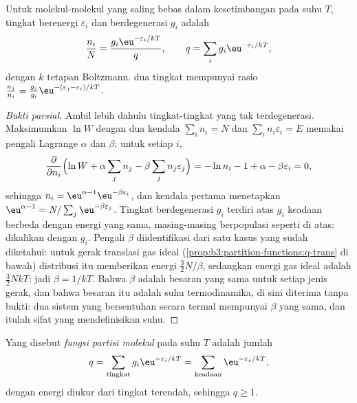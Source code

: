 \begin{theorem}\label{thm:b3:partition-functions:boltzmann}
Untuk molekul-molekul yang saling bebas dalam kesetimbangan pada suhu $T$,
 tingkat berenergi $\varepsilon_i$ dan berdegenerasi $g_i$ adalah
\[
  \frac{n_i}{N} = \frac{g_i\eu^{-\varepsilon_i/kT}}{q},
  \qquad q = \sum_i g_i\eu^{-\varepsilon_i/kT},
\]
dengan $k$ tetapan Boltzmann.  dua tingkat mempunyai rasio
$\frac{n_j}{n_i} = \frac{g_j}{g_i}\eu^{-(\varepsilon_j - \varepsilon_i)/kT}$.
\end{theorem}

\begin{proof}[Bukti parsial]
Ambil lebih dahulu tingkat-tingkat yang tak terdegenerasi. Maksimumkan $\ln W$
dengan dua kendala $\sum_in_i = N$ dan $\sum_in_i\varepsilon_i = E$ memakai
pengali Lagrange $\alpha$ dan $\beta$: untuk setiap $i$,
\[
  \frac{\partial}{\partial n_i}\Bigl(\ln W + \alpha\sum_jn_j - \beta\sum_jn_j\varepsilon_j\Bigr)
  = -\ln n_i - 1 + \alpha - \beta\varepsilon_i = 0,
\]
sehingga $n_i = \eu^{\alpha - 1}\eu^{-\beta\varepsilon_i}$, dan kendala pertama
menetapkan $\eu^{\alpha - 1}
= N/\sum_j\eu^{-\beta\varepsilon_j}$. Tingkat berdegenerasi $g_i$ terdiri atas $g_i$
keadaan berbeda dengan energi yang sama, masing-masing berpopulasi seperti di
atas:  dikalikan dengan $g_i$. Pengali $\beta$ diidentifikasi dari
satu kasus yang sudah diketahui: untuk gerak translasi gas ideal
(\cref{prop:b3:partition-functions:q-trans} di bawah) distribusi itu
memberikan energi $\frac32N/\beta$, sedangkan energi gas ideal adalah
$\frac32NkT$; jadi $\beta = 1/kT$. Bahwa $\beta$ adalah besaran yang sama untuk
setiap jenis gerak, dan bahwa besaran itu adalah suhu termodinamika, di sini
diterima tanpa bukti: dua sistem yang bersentuhan secara termal mempunyai
$\beta$ yang sama, dan itulah sifat yang mendefinisikan suhu.
\end{proof}

\begin{definition}\label{def:b3:partition-functions:partition-function}
Yang disebut \emph{fungsi partisi molekul} pada
suhu $T$ adalah jumlah
\[
  q = \sum_{\text{tingkat}}g_i\eu^{-\varepsilon_i/kT} = \sum_{\text{keadaan}}\eu^{-\varepsilon_s/kT},
\]
dengan energi diukur dari tingkat terendah, sehingga $q \ge 1$.
\end{definition}


